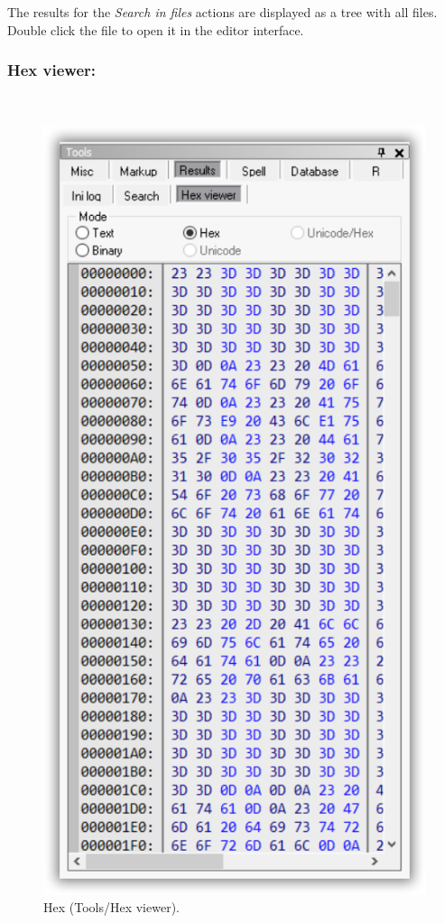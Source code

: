 The results for the \textit{Search in files} actions are displayed
as a tree with all files. Double click the file to open it in
the editor interface.


\subsubsection{Hex viewer:}
\\

\begin{figure}[H]
  \includegraphics[scale=0.35]{./res/tools_results_hex.png}
  \caption{Hex (Tools/Hex viewer).}
  \label{fig:tools_results_hex}
\end{figure}

